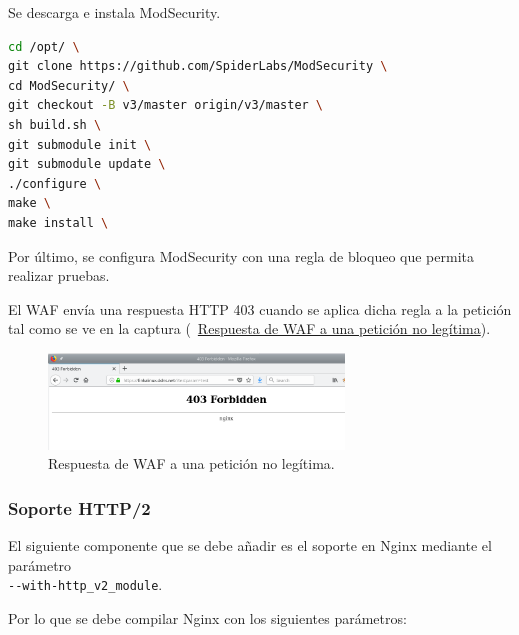 \par Se descarga e instala ModSecurity. \\
\begin{minipage}{\linewidth}
\begin{lstlisting}[language=bash]
cd /opt/ \
git clone https://github.com/SpiderLabs/ModSecurity \
cd ModSecurity/ \
git checkout -B v3/master origin/v3/master \
sh build.sh \
git submodule init \
git submodule update \
./configure \
make \
make install \
\end{lstlisting}
\end{minipage}

\par Por último, se configura ModSecurity con una regla de bloqueo que permita realizar pruebas.\\
\begin{minipage}{\linewidth}
  
\end{minipage}
\par El WAF envía una respuesta HTTP 403 cuando se aplica dicha regla a la petición tal como se ve en la captura ({~\hyperref[fig:WAF_test]{Respuesta de WAF a una petición no legítima}}).

\begin{figure}[!ht]
  \centering
  \label{fig:WAF_test}
  \includegraphics[width=0.7\textwidth]{fig/WAF_testparam}
  \caption{Respuesta de WAF a una petición no legítima. }
\end{figure}

\subsubsection{Soporte HTTP/2}
\par El siguiente componente que se debe añadir es el soporte en Nginx mediante el parámetro \\ \lstinline{--with-http_v2_module}.

\par Por lo que se debe compilar Nginx con los siguientes parámetros:\\
\begin{minipage}{\linewidth}
  
\end{minipage}

